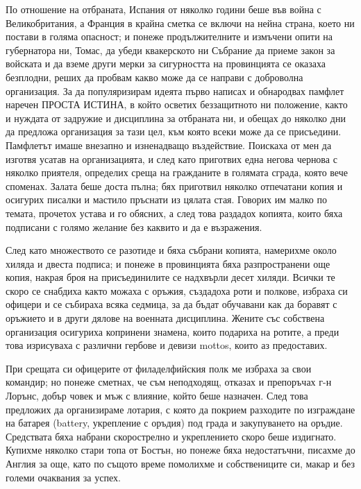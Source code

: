 \documentclass[12pt]{book}
\begin{document}
По отношение на отбраната, Испания от няколко години беше във война с Великобритания, а Франция в крайна сметка се включи на нейна страна, което ни постави в голяма опасност; и понеже продължителните и измъчени опити на губернатора ни, Томас, да убеди квакерското ни Събрание да приеме закон за войската и да вземе други мерки за сигурността на провинцията се оказаха безплодни, реших да пробвам какво може да се направи с доброволна организация. За да популяризирам идеята първо написах и обнародвах памфлет наречен ПРОСТА ИСТИНА, в който осветих беззащитното ни положение, както и нуждата от задружие и дисциплина за отбраната ни, и обещах до няколко дни да предложа организация за тази цел, към която всеки може да се присъедини. Памфлетът имаше внезапно и изненадващо въздействие. Поискаха от мен да изготвя усатав на организацията, и след като приготвих една негова чернова с няколко приятеля, определих среща на гражданите в голямата сграда, която вече споменах. Залата беше доста пълна; бях приготвил няколко отпечатани копия и осигурих писалки и мастило пръснати из цялата стая. Говорих им малко по темата, прочетох устава и го обясних, а след това раздадох копията, които бяха подписани с голямо желание без каквито и да е възражения.

След като множеството се разотиде и бяха събрани копията, намерихме около хиляда и двеста подписа; и понеже в провинцията бяха разпространени още копия, накрая броя на присъединилите се надхвърли десет хиляди. Всички те скоро се снабдиха както можаха с оръжия, създадоха роти и полкове, избраха си офицери и се събираха всяка седмица, за да бъдат обучавани как да боравят с оръжието и в други дялове на военната  дисциплина. Жените със собствена организация осигуриха копринени знамена, които подариха на ротите, а преди това изрисуваха с различни гербове и девизи mottos, които аз предоставих.

При срещата си офицерите от филаделфийския полк ме избраха за свои командир; но понеже сметнах, че съм неподходящ, отказах и препоръчах г-н Лорънс, добър човек и мъж с влияние, който беше назначен. След това предложих да организираме лотария, с която да покрием разходите по изграждане на батарея (battery, укрепление с оръдия) под града и закупуването на оръдие. Средствата бяха набрани скорострелно и укреплението скоро беше издигнато. Купихме няколко стари топа от Бостън, но понеже бяха недостатъчни, писахме до Англия за още, като по същото време помолихме и собствениците си, макар и без големи очаквания за успех.
\end{document}
